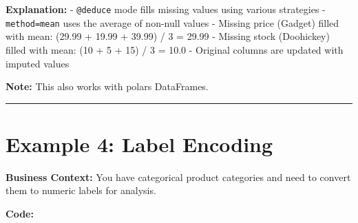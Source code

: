 \documentclass[
  letterpaper,
]{scrbook}
\begin{document}
\textbf{Explanation:} -
\texttt{\textquotesingle{}@deduce\textquotesingle{}} mode fills missing
values using various strategies -
\texttt{method=\textquotesingle{}mean\textquotesingle{}} uses the
average of non-null values - Missing price (Gadget) filled with mean:
(29.99 + 19.99 + 39.99) / 3 = 29.99 - Missing stock (Doohickey) filled
with mean: (10 + 5 + 15) / 3 = 10.0 - Original columns are updated with
imputed values

\textbf{Note:} This also works with polars DataFrames.

\begin{center}\rule{0.5\linewidth}{0.5pt}\end{center}

\section{Example 4: Label Encoding}\label{example-4-label-encoding}

\textbf{Business Context:} You have categorical product categories and
need to convert them to numeric labels for analysis.

\textbf{Code:}
\end{document}
